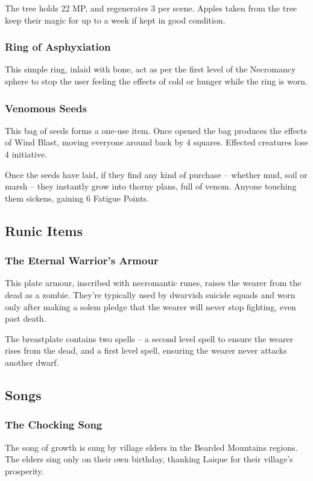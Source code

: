 The tree holds 22 MP, and regenerates 3 per scene.  Apples taken from the tree keep their magic for up to a week if kept in good condition.

\subsubsection{Ring of Asphyxiation}

This simple ring, inlaid with bone, act as per the first level of the Necromancy sphere to stop the user feeling the effects of cold or hunger while the ring is worn.

\subsubsection{Venomous Seeds}

This bag of seeds forms a one-use item.  Once opened the bag produces the effects of Wind Blast, moving everyone around back by 4 squares.  Effected creatures lose 4 initiative.

Once the seeds have laid, if they find any kind of purchase -- whether mud, soil or marsh -- they instantly grow into thorny plans, full of venom.  Anyone touching them sickens, gaining 6 Fatigue Points.

\subsection{Runic Items}

\subsubsection{The Eternal Warrior's Armour}

This plate armour, inscribed with necromantic runes, raises the wearer from the dead as a zombie.  They're typically used by dwarvish suicide squads and worn only after making a solem pledge that the wearer will never stop fighting, even past death.

The breastplate contains two spells -- a second level spell to ensure the wearer rises from the dead, and a first level spell, ensuring the wearer never attacks another dwarf.

\subsection{Songs}

\subsubsection{The Chocking Song}
The song of growth is sung by village elders in the Bearded Mountains regions.  The elders sing only on their own birthday, thanking Laique for their village's prosperity.

